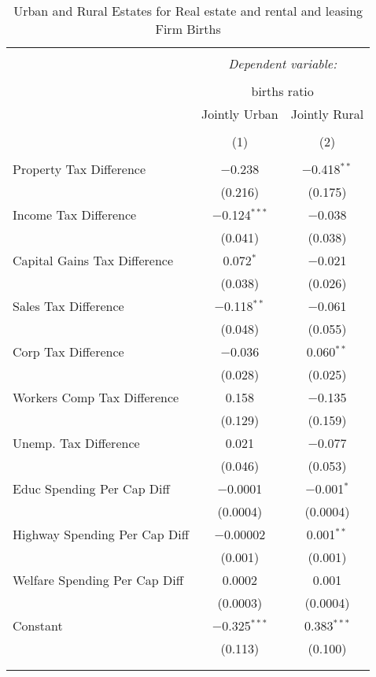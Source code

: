 
\begin{table}[!htbp] \centering 
  \caption{Urban and Rural Estates for  Real estate and rental and leasing Firm Births} 
  \label{} 
\begin{tabular}{@{\extracolsep{5pt}}lcc} 
\\[-1.8ex]\hline 
\hline \\[-1.8ex] 
 & \multicolumn{2}{c}{\textit{Dependent variable:}} \\ 
\cline{2-3} 
\\[-1.8ex] & \multicolumn{2}{c}{births ratio} \\ 
 & Jointly Urban & Jointly Rural \\ 
\\[-1.8ex] & (1) & (2)\\ 
\hline \\[-1.8ex] 
 Property Tax Difference & $-$0.238 & $-$0.418$^{**}$ \\ 
  & (0.216) & (0.175) \\ 
  Income Tax Difference & $-$0.124$^{***}$ & $-$0.038 \\ 
  & (0.041) & (0.038) \\ 
  Capital Gains Tax Difference & 0.072$^{*}$ & $-$0.021 \\ 
  & (0.038) & (0.026) \\ 
  Sales Tax Difference & $-$0.118$^{**}$ & $-$0.061 \\ 
  & (0.048) & (0.055) \\ 
  Corp Tax Difference & $-$0.036 & 0.060$^{**}$ \\ 
  & (0.028) & (0.025) \\ 
  Workers Comp Tax Difference & 0.158 & $-$0.135 \\ 
  & (0.129) & (0.159) \\ 
  Unemp. Tax Difference & 0.021 & $-$0.077 \\ 
  & (0.046) & (0.053) \\ 
  Educ Spending Per Cap Diff & $-$0.0001 & $-$0.001$^{*}$ \\ 
  & (0.0004) & (0.0004) \\ 
  Highway Spending Per Cap Diff & $-$0.00002 & 0.001$^{**}$ \\ 
  & (0.001) & (0.001) \\ 
  Welfare Spending Per Cap Diff & 0.0002 & 0.001 \\ 
  & (0.0003) & (0.0004) \\ 
  Constant & $-$0.325$^{***}$ & 0.383$^{***}$ \\ 
  & (0.113) & (0.100) \\ 
 \hline \\[-1.8ex] 
\hline 
\hline \\[-1.8ex] 
\end{tabular} 
\end{table} 
